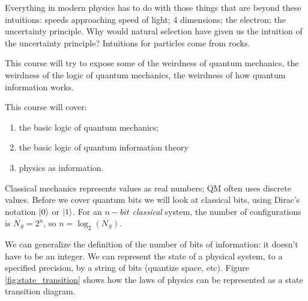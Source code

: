 \documentclass[]{article}
\begin{document}
Everything in modern physics has to do with those things that are beyond these intuitions:
speeds approaching speed of light; 4 dimensions; the electron; the uncertainty principle. Why would natural selection have given us the intuition of the uncertainty principle? Intuitions for particles come from rocks.

This course will try to expose some of the weirdness of quantum mechanics, the weirdness of the logic of quantum mechanics, the weirdness of how quantum information works. 

This course will cover:
\begin{enumerate}
	\item the basic logic of quantum mechanics;
	\item the basic logic of quantum information theory
	\item physics as information.
\end{enumerate}

Classical mechanics represents values as real numbers; QM often uses discrete values. Before we cover quantum bits we will look at classical bits, using Dirac's notation $\ket{0}$ or $\ket{1}$. For an $n-bit$ \emph{classical} system, the number of configurations is $N_S=2^n$, so $n=\log_2(N_S)$.

We can generalize the definition of the number of bits of information: it doesn't have to be an integer. We can represent the state of a physical system, to a specified precision, by a string of bits (quantize space, etc). Figure \ref{fig:state_transition} shows how the laws of physics can be represented as a state transition diagram.
\end{document}
